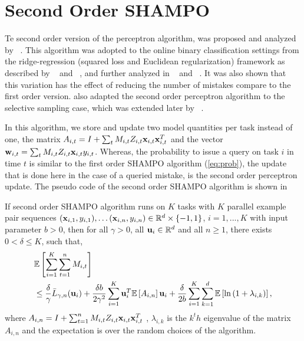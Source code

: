 \section{Second Order SHAMPO}
Te second order version of the perceptron algorithm, was proposed and analyzed by 
~\cite{CesaBianchiCoGe05}. This algorithm was adopted to the online binary classification 
settings from the ridge-regression (squared loss and Euclidean regularization) framework as described by 
~\cite{hoerl1970ridge} and ~\cite{Vovk97}, and further analyzed in ~\cite{AzouryWa01} and  ~\cite{forster2002relative}. 
It was also shown that this variation has the effect of reducing the number of mistakes compare to the first order version. 
\cite{cesa2006worst} also adapted the second order perceptron algorithm to the selective sampling case, 
which was extended later by ~\cite{crammer2014doubly}.

In this algorithm, we store and update two model quantities per task instead of one, the matrix 
$A_{i,t} = I+\sum_{t}M_{i,t}Z_{i,t}\mathbf{x}_{i,t}\mathbf{x}_{i,t}^T$ and the vector $\mathbf{w}_{i,t} = \sum_{t}M_{i,t}Z_{i,t} \mathbf{x}_{i,t}  y_{i,t}$.
Whereas, the probability to issue a query on task $i$ in time $t$ is similar to the first order SHAMPO 
algorithm (\eqref{eq:prob}),
the update that is done here in the case of a queried mistake, is the second order perceptron update.  
The pseudo code of the second order SHAMPO algorithm is shown in 

\begin{theorem}
  If second order SHAMPO algorithm runs on $K$ tasks with $K$ parallel example pair
  sequences
  $(\mathbf{x}_{i,1},y_{i,1}),\ldots (\mathbf{x}_{i,n},y_{i,n})\in\mathbb{R}^d\times\{-1,1\}$,
  $i=1,...,K$ with input parameter $b>0$, then for all $\gamma>0$, all
  $\mathbf{u}_{i}\in\mathbb{R}^d$ and all $n\ge1$, there exists $0<\delta\le K$, such that,
  \begin{equation*}
  \begin{split}
   &\mathbb{E}\left[{\sum_{i=1}^{K}\sum_{t=1}^{n}{M_{i,t}}}\right] \\
   &\le \frac{\delta}{\gamma}{\bar L}_{\gamma,n}(\mathbf{u}_{i})
+ \frac{\delta b}{2\gamma^2}\sum_{i=1}^{K}\mathbf{u}_i^T\mathbb{E}\left[{A_{i,n}}\right]\mathbf{u}_i+ 
\frac{\delta}{2b}\sum_{i=1}^{K}\sum_{k=1}^{d}\mathbb{E}\left[{\ln\left({1+\lambda_{i,k}}\right)}\right],
\end{split}
\end{equation*} 
 where $A_{i,n} = I+\sum_{t=1}^{n}M_{i,t}Z_{i,t}\mathbf{x}_{i,t}\mathbf{x}_{i,t}^T$ , $\lambda_{i,k}$ is the $k^th$ eigenvalue
 of the matrix $A_{i,n}$ and the expectation is over the random choices of the algorithm.
\end{theorem} \label{thm:SO_bound}

